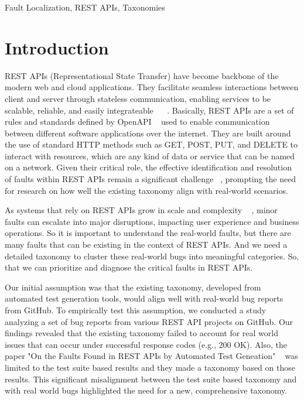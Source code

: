 \documentclass[conference]{IEEEtran}
\begin{document}
\begin{IEEEkeywords}
Fault Localization, REST APIs, Taxonomies
\end{IEEEkeywords}


\section{Introduction}
\label{sec:introduction}




REST APIs (Representational State Transfer) have become backbone of the modern web and cloud applications. 
They facilitate seamless interactions between client and server through stateless communication, enabling services to be scalable, reliable, and easily integrateable ~\cite{li2016} ~\cite{neumann2018}. 
Basically, REST APIs are a set of rules and standards  defined by OpenAPI ~\cite{ed-douibi2018} used to enable communication between different software applications over the internet. They are built around the use of standard HTTP methods such as GET, POST, PUT, and DELETE to interact with resources, which are any kind of data or service that can be named on a network.
Given their critical role, the effective identification and resolution of faults within REST APIs remain a significant challenge ~\cite{barbir2007}, prompting the need for research on how well the existing taxonomy align with real-world scenarios.

As systems that rely on REST APIs grow in scale and complexity  ~\cite{khare2004} , minor faults can escalate into major disruptions, impacting user experience and business operations. 
So it is important to understand the real-world faults, but there are many faults that can be existing in the context of REST APIs. And we need a detailed taxonomy to cluster these real-world bugs into meaningful categories. So, that we can prioritize and diagnose the critical faults in REST APIs.

Our initial assumption was that the existing taxonomy, developed from automated test generation tools, would align well with real-world bug reports from GitHub. 
To empirically test this assumption, we conducted a study analyzing a set of bug reports from various REST API projects on GitHub. 
Our findings revealed that the existing taxonomy failed to account for real world issues that can occur under successful response codes (e.g., 200 OK). Also, the paper "On the Faults Found in REST APIs by Automated Test Geneation" ~\cite{automatedTestTaxonomy} was limited to the test suite based results and they made a taxonomy based on those results. 
This significant misalignment between the test suite based taxonomy and with real world bugs highlighted the need for a new, comprehensive taxonomy.
\end{document}
